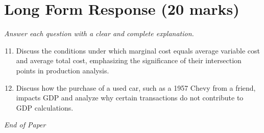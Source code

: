 \documentclass[12pt]{article}
\begin{document}
\section*{Long Form Response (20 marks)}
\textit{Answer each question with a clear and complete explanation.}
\begin{enumerate}[label=\arabic*.]
\setcounter{enumi}{10}
\item Discuss the conditions under which marginal cost equals average variable cost and average total cost, emphasizing the significance of their intersection points in production analysis.
\item Discuss how the purchase of a used car, such as a 1957 Chevy from a friend, impacts GDP and analyze why certain transactions do not contribute to GDP calculations.
\end{enumerate}

\vfill
\noindent\textit{End of Paper}
\end{document}
